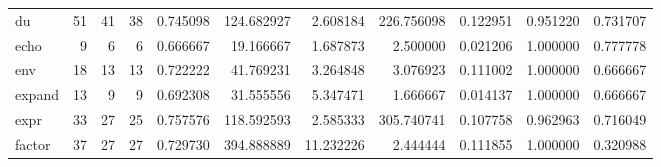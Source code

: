 \begin{tabular}{lrrrrrrrrrr}
du        &                                      51 &                 41 &                                38 &                                   0.745098 &                             124.682927 &                                     2.608184 &                        226.756098 &                                0.122951 &                           0.951220 &                                           0.731707 \\
echo      &                                       9 &                  6 &                                 6 &                                   0.666667 &                              19.166667 &                                     1.687873 &                          2.500000 &                                0.021206 &                           1.000000 &                                           0.777778 \\
env       &                                      18 &                 13 &                                13 &                                   0.722222 &                              41.769231 &                                     3.264848 &                          3.076923 &                                0.111002 &                           1.000000 &                                           0.666667 \\
expand    &                                      13 &                  9 &                                 9 &                                   0.692308 &                              31.555556 &                                     5.347471 &                          1.666667 &                                0.014137 &                           1.000000 &                                           0.666667 \\
expr      &                                      33 &                 27 &                                25 &                                   0.757576 &                             118.592593 &                                     2.585333 &                        305.740741 &                                0.107758 &                           0.962963 &                                           0.716049 \\
factor    &                                      37 &                 27 &                                27 &                                   0.729730 &                             394.888889 &                                    11.232226 &                          2.444444 &                                0.111855 &                           1.000000 &                                           0.320988 \\

\end{tabular}
